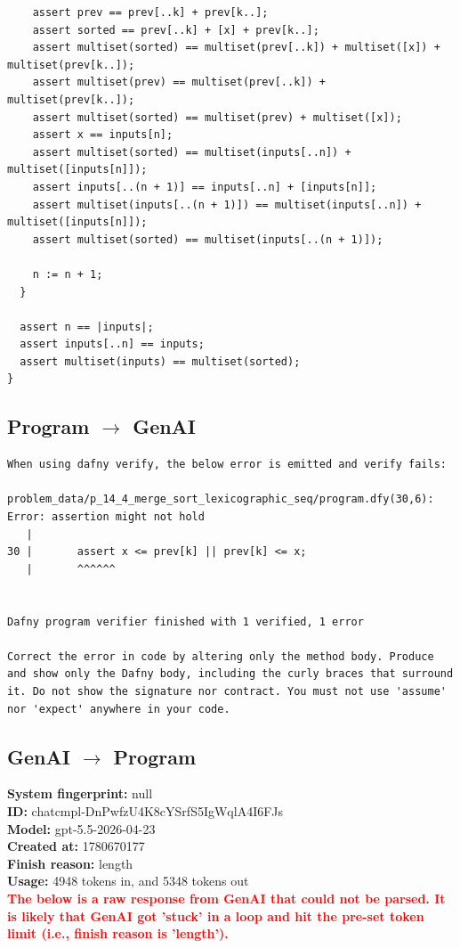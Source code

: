 \documentclass{article}
\begin{document}
\begin{lstlisting}
    assert prev == prev[..k] + prev[k..];
    assert sorted == prev[..k] + [x] + prev[k..];
    assert multiset(sorted) == multiset(prev[..k]) + multiset([x]) + multiset(prev[k..]);
    assert multiset(prev) == multiset(prev[..k]) + multiset(prev[k..]);
    assert multiset(sorted) == multiset(prev) + multiset([x]);
    assert x == inputs[n];
    assert multiset(sorted) == multiset(inputs[..n]) + multiset([inputs[n]]);
    assert inputs[..(n + 1)] == inputs[..n] + [inputs[n]];
    assert multiset(inputs[..(n + 1)]) == multiset(inputs[..n]) + multiset([inputs[n]]);
    assert multiset(sorted) == multiset(inputs[..(n + 1)]);

    n := n + 1;
  }

  assert n == |inputs|;
  assert inputs[..n] == inputs;
  assert multiset(inputs) == multiset(sorted);
}
\end{lstlisting}
\subsection*{Program $\rightarrow$ GenAI}
\begin{lstlisting}
When using dafny verify, the below error is emitted and verify fails:

problem_data/p_14_4_merge_sort_lexicographic_seq/program.dfy(30,6): Error: assertion might not hold
   |
30 |       assert x <= prev[k] || prev[k] <= x;
   |       ^^^^^^


Dafny program verifier finished with 1 verified, 1 error

Correct the error in code by altering only the method body. Produce and show only the Dafny body, including the curly braces that surround it. Do not show the signature nor contract. You must not use 'assume' nor 'expect' anywhere in your code.
\end{lstlisting}
\subsection*{GenAI $\rightarrow$ Program}
\textbf{System fingerprint: }null
\\\textbf{ID: }chatcmpl-DnPwfzU4K8cYSrfS5IgWqlA4I6FJs
\\\textbf{Model: }gpt-5.5-2026-04-23
\\\textbf{Created at: }1780670177
\\\textbf{Finish reason: }length
\\\textbf{Usage: }4948 tokens in, and 5348 tokens out
\\\textcolor{red}{\textbf{The below is a raw response from GenAI that could not be parsed. It is likely that GenAI got 'stuck' in a loop and hit the pre-set token limit (i.e., finish reason is 'length').}}
\begin{lstlisting}

\end{lstlisting}
\end{document}
